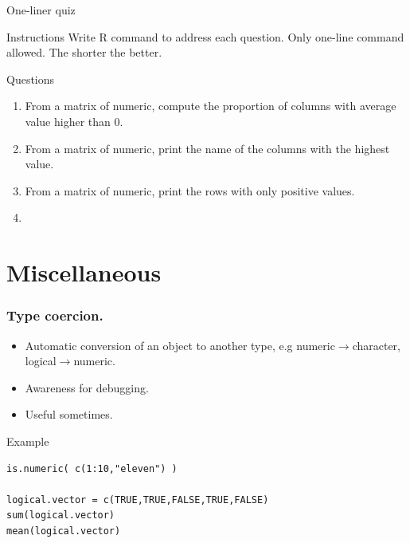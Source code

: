 \documentclass[10pt]{beamer}
\newenvironment{xframe}[2][]
  {\begin{frame}[fragile,environment=xframe,#1]
  \frametitle{#2}}
  {\end{frame}}
\begin{document}

\begin{frame}{One-liner quiz}
  \begin{block}{Instructions}
    Write R command to address each question. Only one-line command allowed. The shorter the better.
  \end{block}
  \begin{block}{Questions}
    \begin{enumerate}
    \item From a matrix of numeric, compute the proportion of columns with average value higher than 0.
    \item From a matrix of numeric, print the name of the columns with the highest value.
    \item From a matrix of numeric, print the rows with only positive values.
    \item 
    \end{enumerate}
  \end{block}
\end{frame}

\section{Miscellaneous}

\begin{xframe}{Type coercion.}
  \begin{block}{}
    \begin{itemize}
    \item Automatic conversion of an object to another type, e.g {\sf numeric}$\rightarrow${\sf character}, {\sf logical}$\rightarrow${\sf numeric}.
    \item Awareness for debugging.
    \item Useful sometimes.
    \end{itemize}
  \end{block}
  \begin{exampleblock}{Example}
\begin{verbatim}
is.numeric( c(1:10,"eleven") )

logical.vector = c(TRUE,TRUE,FALSE,TRUE,FALSE)
sum(logical.vector)
mean(logical.vector)
\end{verbatim}  
  \end{exampleblock}
\end{xframe}

\end{document}
